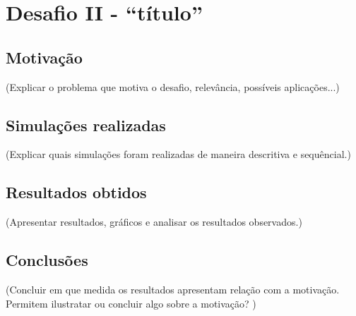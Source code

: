 \section{Desafio II - ``título''} 
 
\subsection{Motivação}
(Explicar o problema que motiva o desafio, relevância, possíveis aplicações...) 

\subsection{Simulações realizadas}
(Explicar quais simulações foram realizadas de maneira descritiva e sequêncial.) 

\subsection{Resultados obtidos}
(Apresentar resultados, gráficos e analisar os resultados observados.) 

\subsection{Conclusões}
(Concluir em que medida os resultados apresentam relação com a motivação. Permitem ilustratar ou concluir algo sobre a motivação? )